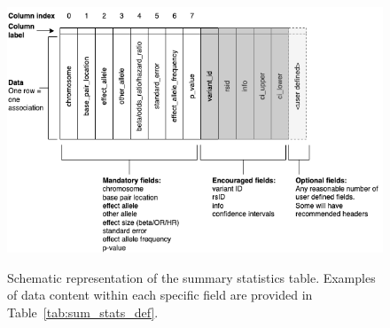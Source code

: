 \documentclass[11pt]{article}
\begin{document}
\begin{figure}[h]
 \centering
 \caption{Schematic representation of the summary statistics table. Examples of data content within each specific field are provided in Table~\ref{tab:sum_stats_def}.}
 \includegraphics[width=\textwidth]{schematic}
 \label{fig:schematic}
\end{figure}
\end{document}
